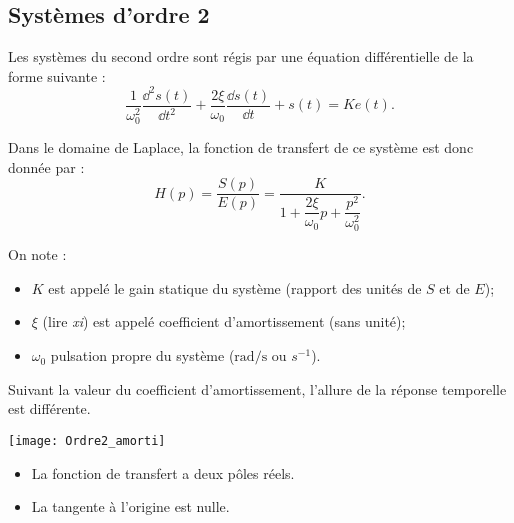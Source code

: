 \subsection{Systèmes d'ordre 2}


\begin{marginfigure}
\end{marginfigure}

\begin{defi}
Les systèmes du second ordre sont régis par une équation différentielle de la
forme suivante :
$$
\dfrac{1}{\omega_0^2} \dfrac{\dd^2 s(t)}{\dd t^2}+\dfrac{2\xi}{\omega_0} \dfrac{\dd s(t)}{\dd t}+s(t) = Ke(t).
$$

Dans le domaine de Laplace, la fonction de transfert de ce système est donc
donnée par :
$$ H(p)=\dfrac{S(p)}{E(p)} = \dfrac{K}{1+ \dfrac{2\xi}{\omega_0}p+\dfrac{p^2}{\omega_0^2}}. $$


On note :
\begin{itemize}
\item $K$ est appelé le gain statique du système (rapport des unités de $S$ et de $E$);
\item $\xi$ (lire \textit{xi}) est appelé coefficient d'amortissement (sans unité);
\item $\omega_0$ pulsation propre du système ($\text{rad/s}$ ou $s^{-1}$).
\end{itemize}

Suivant la valeur du coefficient d'amortissement, l'allure de la réponse temporelle est différente.
\end{defi}



\begin{marginfigure}
\texttt{[image: Ordre2\_amorti]}
\end{marginfigure}

\begin{resultat}
\begin{itemize} 
\item La fonction de transfert a deux pôles réels.
\item La tangente à l'origine est nulle.
\end{itemize}
\end{resultat}




